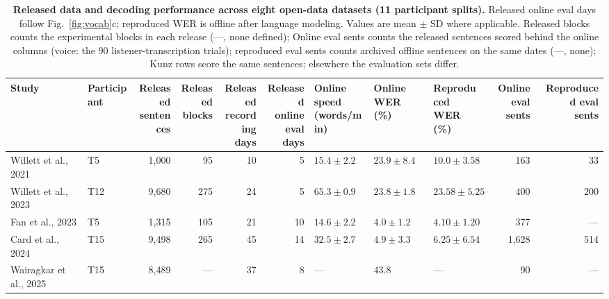 \documentclass[11pt]{article}
\begin{document}
\begin{table}[t]
\centering
\footnotesize
\setlength{\tabcolsep}{3pt}
\renewcommand{\arraystretch}{1.12}
\caption{\textbf{Released data and decoding performance across eight
open-data datasets (11 participant splits).}
Released online eval days follow Fig.~\ref{fig:vocab}c; reproduced WER is
offline after language modeling. Values are mean $\pm$ SD where applicable. Released blocks counts the experimental blocks in each release (---, none defined); Online eval sents counts the released sentences scored behind the online columns (voice: the 90 listener-transcription trials); reproduced eval sents counts archived offline sentences on the same dates (---, none); Kunz rows score the same sentences; elsewhere the evaluation sets differ.}
\label{tab:repro}
\begin{tabular}{@{}>{\raggedright\arraybackslash}p{3.50cm}lrrrrlllrr@{}}
\toprule
Study & Participant & \shortstack[r]{Released\\sentences} & \shortstack[r]{Released\\blocks} & \shortstack[r]{Released\\recording\\days} & \shortstack[r]{Released\\online eval\\days} & \shortstack[l]{Online speed\\(words/min)} & \shortstack[l]{Online WER\\(\%)} & \shortstack[l]{Reproduced\\WER (\%)} & \shortstack[r]{Online eval\\sents} & \shortstack[r]{Reproduced eval\\sents} \\
\midrule
Willett et al., 2021 \cite{willett2021} & T5 & 1{,}000 & 95 & 10 & 5 & $15.4{\pm}2.2$ & $23.9{\pm}8.4$ & $10.0{\pm}3.58$ & 163 & 33 \\
Willett et al., 2023 \cite{willett2023} & T12 & 9{,}680 & 275 & 24 & 5 & $65.3{\pm}0.9$ & $23.8{\pm}1.8$ & $23.58{\pm}5.25$ & 400 & 200 \\
Fan et al., 2023 \cite{fan2023} & T5 & 1{,}315 & 105 & 21 & 10 & $14.6{\pm}2.2$ & $4.0{\pm}1.2$ & $4.10{\pm}1.20$ & 377 & --- \\
Card et al., 2024 \cite{card2024} & T15 & 9{,}498 & 265 & 45 & 14 & $32.5{\pm}2.7$ & $4.9{\pm}3.3$ & $6.25{\pm}6.54$ & 1{,}628 & 514 \\
Wairagkar et al., 2025 \cite{wairagkar2025} & T15 & 8{,}489 & --- & 37 & 8 & --- & 43.8 & --- & 90 & --- \\

\end{tabular}
\end{table}
\end{document}
